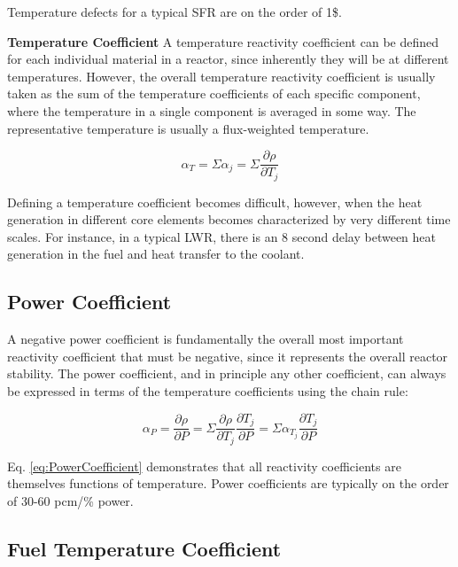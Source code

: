 \documentclass[10pt]{article}
\begin{document}
\begin{flushleft}
Temperature defects for a typical SFR are on the order of 1\$.

\textbf{Temperature Coefficient}
A temperature reactivity coefficient can be defined for each individual material in a reactor, since inherently they will be at different temperatures. However, the overall temperature reactivity coefficient is usually taken as the sum of the temperature coefficients of each specific component, where the temperature in a single component is averaged in some way. The representative temperature is usually a flux-weighted temperature. 

\begin{equation}
\label{eq:TotalTempCoef}
\alpha_T = \Sigma \alpha_j = \Sigma \frac{\partial\rho}{\partial T_j}
\end{equation}

Defining a temperature coefficient becomes difficult, however, when the heat generation in different core elements becomes characterized by very different time scales. For instance, in a typical LWR, there is an 8 second delay between heat generation in the fuel and heat transfer to the coolant.

\subsection{Power Coefficient}

A negative power coefficient is fundamentally the overall most important reactivity coefficient that must be negative, since it represents the overall reactor stability. The power coefficient, and in principle any other coefficient, can always be expressed in terms of the temperature coefficients using the chain rule:

\begin{equation}
\label{eq:PowerCoefficient}
\alpha_P = \frac{\partial\rho}{\partial P} = \Sigma \frac{\partial\rho}{\partial T_j}\frac{\partial T_j}{\partial P} = \Sigma \alpha_{T_j}\frac{\partial T_j}{\partial P}
\end{equation}

Eq. \ref{eq:PowerCoefficient} demonstrates that all reactivity coefficients are themselves functions of temperature. Power coefficients are typically on the order of 30-60 pcm/\% power.

\subsection{Fuel Temperature Coefficient}


\end{flushleft}
\end{document}
